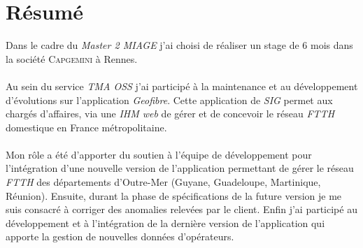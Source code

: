 \chapter*{Résumé}
Dans le cadre du \textit{Master 2 MIAGE} j'ai choisi de réaliser un stage de 6 mois dans la société \textsc{Capgemini} à Rennes.
\\\\
Au sein du service \textit{TMA OSS} j'ai participé à la maintenance et au développement d'évolutions sur l'application \textit{Geofibre}.
Cette application de \textit{SIG} permet aux chargés d'affaires, via une \textit{IHM web} de gérer et de concevoir le réseau \textit{FTTH} domestique en France métropolitaine.
\\\\
Mon rôle a été d'apporter du soutien à l'équipe de développement pour l'intégration d'une nouvelle version de l'application
permettant de gérer le réseau \textit{FTTH} des départements d'Outre-Mer (Guyane, Guadeloupe, Martinique, Réunion).
Ensuite, durant la phase de spécifications de la future version je me suis consacré à corriger des anomalies relevées par le client.
Enfin j'ai participé au développement et à l'intégration de la dernière version de l'application qui apporte la gestion de nouvelles données d'opérateurs.
